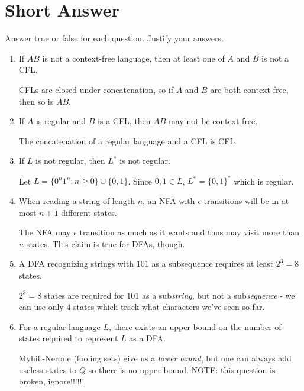\documentclass[fleqn]{article}
\begin{document}
\section{Short Answer}
Answer true or false for each question. Justify your answers.
\begin{enumerate}
    \item If $AB$ is not a context-free language, then at least one of $A$ and $B$ is not a CFL.
    \begin{answer}
         CFLs are closed under concatenation, so if $A$ and $B$ are both context-free, then so is $AB$.
    \end{answer}
    \item If $A$ is regular and $B$ is a CFL, then $AB$ may not be context free.
    \begin{answer}
         The concatenation of a regular language and a CFL is CFL.
    \end{answer}
    \item If $L$ is not regular, then $L^*$ is not regular.
    \begin{answer}
         Let $L = \{0^n 1^n : n \geq 0\} \cup \{0,1\}$. Since $0, 1 \in L$, $L^* = \{0, 1\}^*$ which is regular.
    \end{answer}
    \item When reading a string of length $n$, an NFA with $\epsilon$-transitions will be in at most $n+1$ different states.
    \begin{answer}
         The NFA may $\epsilon$ transition as much as it wants and thus may visit more than $n$ states. This claim is true for DFAs, though.
    \end{answer}
    \item A DFA recognizing strings with $101$ as a subsequence requires at least $2^3 = 8$ states.
    \begin{answer}
         $2^3 = 8$ states are required for $101$ as a sub\textit{string}, but not a sub\textit{sequence} - we can use only $4$ states which track what characters we've seen so far.
    \end{answer}
    \item For a regular language $L$, there exists an upper bound on the number of states required to represent $L$ as a DFA.
    \begin{answer}
         Myhill-Nerode (fooling sets) give us a \textit{lower bound}, but one can always add useless states to $Q$ so there is no upper bound.
        NOTE: this question is broken, ignore!!!!!!
    \end{answer}
\end{enumerate}
\end{document}
